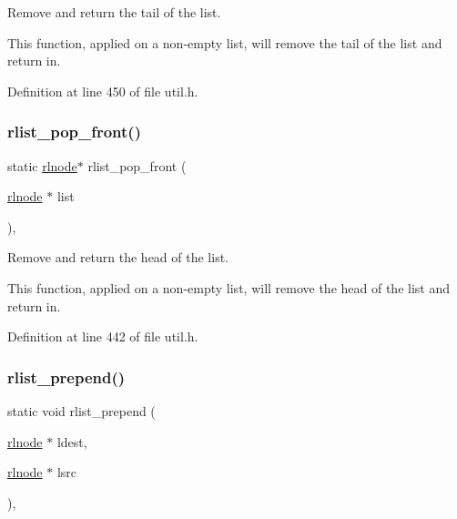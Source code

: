Remove and return the tail of the list. 

This function, applied on a non-\/empty list, will remove the tail of the list and return in. 

Definition at line 450 of file util.\+h.

\mbox{\label{group__rlists_ga5cc2be48f94a7573fb8952356c6ba7d1}} 
\subsubsection{\texorpdfstring{rlist\+\_\+pop\+\_\+front()}{rlist\_pop\_front()}}
{\footnotesize\ttfamily static \hyperlink{group__rlists_ga8f6244877f7ce2322c90525217ea6e7a}{rlnode}$\ast$ rlist\+\_\+pop\+\_\+front (\begin{DoxyParamCaption}\item[{\hyperlink{group__rlists_ga8f6244877f7ce2322c90525217ea6e7a}{rlnode} $\ast$}]{list }\end{DoxyParamCaption})\hspace{0.3cm}{\ttfamily [inline]}, {\ttfamily [static]}}



Remove and return the head of the list. 

This function, applied on a non-\/empty list, will remove the head of the list and return in. 

Definition at line 442 of file util.\+h.

\mbox{\label{group__rlists_ga906dea2f5a25116f979ba6585266453e}} 
\subsubsection{\texorpdfstring{rlist\+\_\+prepend()}{rlist\_prepend()}}
{\footnotesize\ttfamily static void rlist\+\_\+prepend (\begin{DoxyParamCaption}\item[{\hyperlink{group__rlists_ga8f6244877f7ce2322c90525217ea6e7a}{rlnode} $\ast$}]{ldest,  }\item[{\hyperlink{group__rlists_ga8f6244877f7ce2322c90525217ea6e7a}{rlnode} $\ast$}]{lsrc }\end{DoxyParamCaption})\hspace{0.3cm}{\ttfamily [inline]}, {\ttfamily [static]}}



